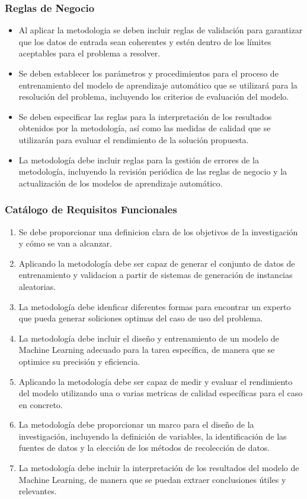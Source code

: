 \subsubsection{Reglas de Negocio}
\begin{itemize}
    \item Al aplicar la metodologia se deben incluir reglas 
    de validación para garantizar que los datos de entrada sean coherentes 
    y estén dentro de los límites aceptables para el problema a resolver.
    \item Se deben establecer los parámetros y procedimientos para el proceso 
    de entrenamiento del modelo de aprendizaje automático que se utilizará 
    para la resolución del problema, incluyendo los criterios de evaluación del modelo.
    \item Se deben especificar las reglas para la interpretación de los resultados 
    obtenidos por la metodología, así como las medidas de calidad que se utilizarán 
    para evaluar el rendimiento de la solución propuesta.
    \item La metodología debe incluir reglas para la gestión de errores
    de la metodología, incluyendo la revisión periódica de las reglas de negocio 
    y la actualización de los modelos de aprendizaje automático.
\end{itemize}
\subsubsection{Catálogo de Requisitos Funcionales}
\begin{enumerate}
    \renewcommand{\labelenumi}{RF\arabic{enumi}}
    \item Se debe proporcionar una definicion clara de los objetivos de la investigación 
    y cómo se van a alcanzar.
    \item Aplicando la metodología debe ser capaz de generar el conjunto de datos de entrenamiento
    y validacion a partir de sistemas de generación de instancias aleatorias.
    \item La metodología debe idenficar diferentes formas para encontrar un experto
    que pueda generar soliciones optimas del caso de uso del problema.
    \item La metodología debe incluir el diseño y entrenamiento de un modelo de Machine Learning 
    adecuado para la tarea específica, de manera que se optimice su precisión y eficiencia.
    \item Aplicando la metodología debe ser capaz de medir y evaluar el rendimiento del modelo 
    utilizando una o varias metricas de calidad específicas para el caso en concreto.
    \item La metodología debe proporcionar un marco para el diseño de la investigación, 
    incluyendo la definición de variables, la identificación de las fuentes de datos y 
    la elección de los métodos de recolección de datos.
    \item La metodología debe incluir la interpretación de los resultados del modelo 
    de Machine Learning, de manera que se puedan extraer conclusiones útiles y relevantes.
\end{enumerate}


